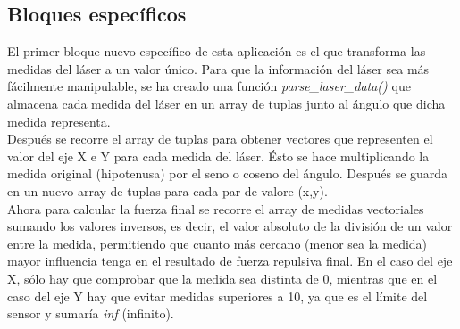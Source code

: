 \subsection{Bloques específicos}
\label{subsec:spec_bloques_VFF}

El primer bloque nuevo específico de esta aplicación es el que transforma las medidas del láser a un valor único.
Para que la información del láser sea más fácilmente manipulable, se ha creado una función \textit{parse\_laser\_data()} que almacena cada medida del láser
en un array de tuplas junto al ángulo que dicha medida representa.\\

Después se recorre el array de tuplas para obtener vectores que representen el valor del eje X e Y para cada medida del láser. Ésto se hace multiplicando la medida
original (hipotenusa) por el seno o coseno del ángulo. Después se guarda en un nuevo array de tuplas para cada par de valore (x,y).\\

Ahora para calcular la fuerza final se recorre el array de medidas vectoriales sumando los valores inversos, es decir, el valor absoluto de la división de un valor
entre la medida, permitiendo que cuanto más cercano (menor sea la medida) mayor influencia tenga en el resultado de fuerza repulsiva final. En el caso del eje X, sólo
hay que comprobar que la medida sea distinta de 0, mientras que en el caso del eje Y hay que evitar medidas superiores a 10, ya que es el límite del sensor y
sumaría \textit{inf} (infinito).


